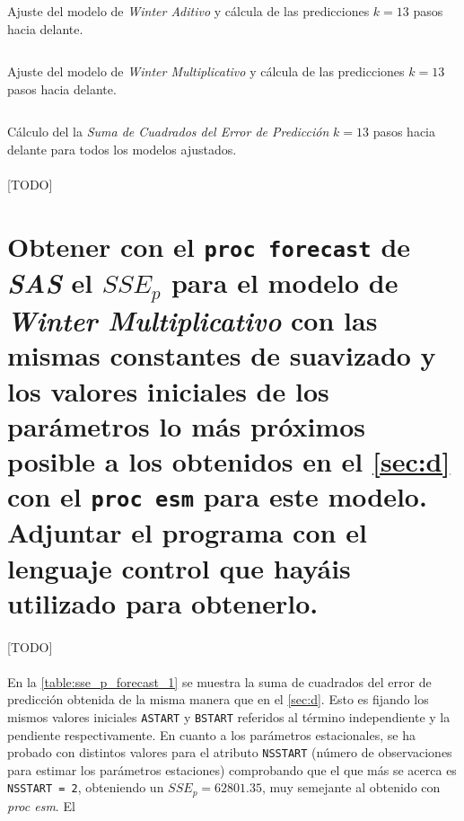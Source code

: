 \documentclass[a4paper, spanish]{article}
\begin{document}
    \begin{listing}[htb!]
      \centering
      \inputminted{SAS}{./res/code/d-02-prediction-error-esm-winteradd.sas}
      \caption{Ajuste del modelo de \emph{Winter Aditivo} y cálcula de las predicciones $k = 13$ pasos hacia delante.}
      \label{code:d_prediction_error_esm_winteradd}
    \end{listing}

    \begin{listing}[htb!]
      \centering
      \inputminted{SAS}{./res/code/d-02-prediction-error-esm-wintermul.sas}
      \caption{Ajuste del modelo de \emph{Winter Multiplicativo} y cálcula de las predicciones $k = 13$ pasos hacia delante.}
      \label{code:d_prediction_error_esm_wintermul}
    \end{listing}

    \begin{listing}[htb!]
      \centering
      \inputminted{SAS}{./res/code/d-03-error-summary.sas}
      \caption{Cálculo del la \emph{Suma de Cuadrados del Error de Predicción} $k = 13$ pasos hacia delante para todos los modelos ajustados.}
      \label{code:d_summary_error}
    \end{listing}

    \paragraph{}
    [TODO]

  \section{Obtener con el \texttt{proc forecast} de \emph{SAS} el $SSE_p$ para el modelo de \emph{Winter Multiplicativo} con las mismas constantes de suavizado y los valores iniciales de los parámetros lo más próximos posible a los obtenidos en el \autoref{sec:d} con el \texttt{proc esm} para este modelo. Adjuntar el programa con el lenguaje control que hayáis utilizado para obtenerlo.}
  \label{sec:e}

    \paragraph{}
    [TODO]

    \paragraph{}
    En la \autoref{table:sse_p_forecast_1} se muestra la suma de cuadrados del error de predicción obtenida de la misma manera que en el \autoref{sec:d}. Esto es fijando los mismos valores iniciales \texttt{ASTART} y \texttt{BSTART} referidos al término independiente y la pendiente respectivamente. En cuanto a los parámetros estacionales, se ha probado con distintos valores para el atributo \texttt{NSSTART} (número de observaciones para estimar los parámetros estaciones) comprobando que el que más se acerca es \texttt{NSSTART = 2}, obteniendo un $SSE_p = 62801.35$, muy semejante al obtenido con \textit{proc esm}. El
\end{document}
